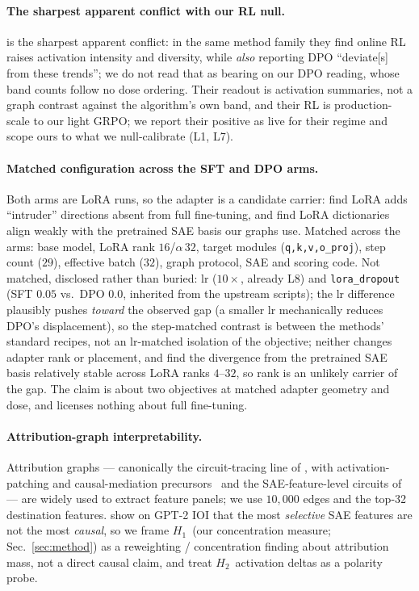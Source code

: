 \documentclass{article}
\newcommand{\Hone}{\ensuremath{H_{1}}}
\newcommand{\Htwo}{\ensuremath{H_{2}}}
\begin{document}
\paragraph{The sharpest apparent conflict with our RL null.} \citet{rl_circuit_intensity2026} is the sharpest apparent conflict: in the same method family they find online RL raises activation intensity and diversity, while \emph{also} reporting DPO ``deviate[s] from these trends''; we do not read that as bearing on our DPO reading, whose band counts follow no dose ordering. Their readout is activation summaries, not a graph contrast against the algorithm's own band, and their RL is production-scale to our light GRPO; we report their positive as live for their regime and scope ours to what we null-calibrate (L1, L7).

\paragraph{Matched configuration across the SFT and DPO arms.} Both arms are LoRA runs, so the adapter is a candidate carrier: \citet{shuttleworth2024lorailluson} find LoRA adds ``intruder'' directions absent from full fine-tuning, and \citet{prasanth2026lorageometry} find LoRA dictionaries align weakly with the pretrained SAE basis our graphs use. Matched across the arms: base model, LoRA rank $16$/$\alpha\,32$, target modules (\texttt{q,k,v,o\_proj}), step count ($29$), effective batch ($32$), graph protocol, SAE and scoring code. Not matched, disclosed rather than buried: lr ($10\times$, already L8) and \texttt{lora\_dropout} (SFT $0.05$ vs.\ DPO $0.0$, inherited from the upstream scripts); the lr difference plausibly pushes \emph{toward} the observed gap (a smaller lr mechanically reduces DPO's
displacement), so the step-matched contrast is between the methods' standard recipes,
not an lr-matched isolation of the objective; neither changes adapter rank or placement, and \citet{prasanth2026lorageometry} find the divergence from the pretrained SAE basis relatively stable across LoRA ranks $4$--$32$, so rank is an unlikely carrier of the gap. The claim is about two objectives at matched adapter geometry and dose, and licenses nothing about full fine-tuning.

\paragraph{Attribution-graph interpretability.}
Attribution graphs --- canonically the circuit-tracing line of \citet{ameisen2025circuit,lindsey2025biology}, with activation-patching and causal-mediation precursors~\citep{heimersheim2024patching,vig2020causal} and the SAE-feature-level circuits of \citet{marks2024sparse_circuits} --- are widely used to extract feature panels; we use $10{,}000$ edges and the top-32 destination features. \citet{five_stage_causal_sae2026} show on GPT-2 IOI that the most \emph{selective} SAE features are not the most \emph{causal}, so we frame \Hone\ (our concentration measure; Sec.~\ref{sec:method}) as a reweighting / concentration finding about attribution mass, not a direct causal claim, and treat \Htwo\ activation deltas as a polarity probe.
\end{document}
